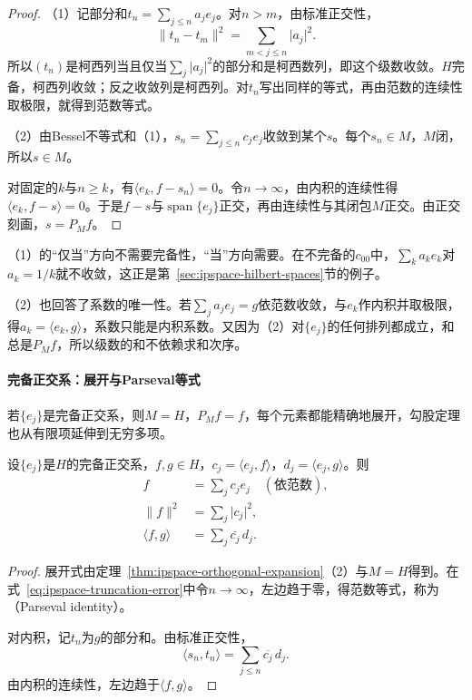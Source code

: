 \begin{proof}
（1）记部分和$t_n=\sum_{j\leq n}a_je_j$。对$n>m$，由标准正交性，
\[
 \lVert t_n-t_m\rVert^2=\sum_{m<j\leq n}\lvert a_j\rvert^2 .
\]
所以$(t_n)$是柯西列当且仅当$\sum_j\lvert a_j\rvert^2$的部分和是柯西数列，即这个级数收敛。$H$完备，柯西列收敛；反之收敛列是柯西列。对$t_n$写出同样的等式，再由范数的连续性取极限，就得到范数等式。

（2）由Bessel不等式和（1），$s_n=\sum_{j\leq n}c_je_j$收敛到某个$s$。每个$s_n\in M$，$M$闭，所以$s\in M$。

对固定的$k$与$n\geq k$，有$\langle e_k,f-s_n\rangle=0$。令$n\to\infty$，由内积的连续性得$\langle e_k,f-s\rangle=0$。于是$f-s$与$\operatorname{span}\{e_j\}$正交，再由连续性与其闭包$M$正交。由正交刻画，$s=P_Mf$。
\end{proof}

（1）的“仅当”方向不需要完备性，“当”方向需要。在不完备的$c_{00}$中，$\sum_ka_ke_k$对$a_k=1/k$就不收敛，这正是第~\ref{sec:ipspace-hilbert-spaces}节的例子。

（2）也回答了系数的唯一性。若$\sum_ja_je_j=g$依范数收敛，与$e_k$作内积并取极限，得$a_k=\langle e_k,g\rangle$，系数只能是内积系数。又因为（2）对$\{e_j\}$的任何排列都成立，和总是$P_Mf$，所以级数的和不依赖求和次序。

\paragraph{完备正交系：展开与Parseval等式}
若$\{e_j\}$是完备正交系，则$M=H$，$P_Mf=f$，每个元素都能精确地展开，勾股定理也从有限项延伸到无穷多项。

\begin{theorem}[Parseval等式]
\label{thm:ipspace-parseval}
设$\{e_j\}$是$H$的完备正交系，$f,g\in H$，$c_j=\langle e_j,f\rangle$，$d_j=\langle e_j,g\rangle$。则
\begin{align}
 f&=\sum_jc_je_j\quad(\text{依范数}),
 \label{eq:ipspace-parseval-expansion}\\
 \lVert f\rVert^2&=\sum_j\lvert c_j\rvert^2,
 \label{eq:ipspace-parseval-norm}\\
 \langle f,g\rangle&=\sum_j\overline{c_j}\,d_j .
 \label{eq:ipspace-parseval-inner}
\end{align}
\end{theorem}

\begin{proof}
展开式由定理~\ref{thm:ipspace-orthogonal-expansion}（2）与$M=H$得到。在式~\eqref{eq:ipspace-truncation-error}中令$n\to\infty$，左边趋于零，得范数等式，称为（Parseval identity）。

对内积，记$t_n$为$g$的部分和。由标准正交性，
\[
 \langle s_n,t_n\rangle=\sum_{j\leq n}\overline{c_j}\,d_j .
\]
由内积的连续性，左边趋于$\langle f,g\rangle$。
\end{proof}

